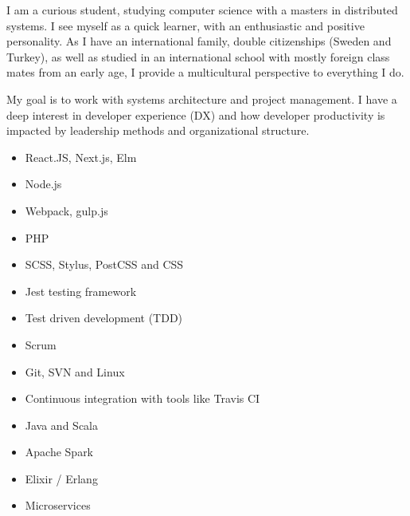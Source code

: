 I am a curious student, studying computer science with a masters in distributed systems. 
I see myself as a quick learner, with an enthusiastic and positive personality. As I have an international family, double citizenships (Sweden and Turkey), as well as studied in an international school with mostly foreign class mates from an early age, I provide a multicultural perspective to everything I do.

My goal is to work with systems architecture and project management. I have a deep interest in developer experience (DX) and how developer productivity is impacted by leadership methods and organizational structure.



\divider




\begin{itemize}
    \item React.JS, Next.js, Elm
    \item Node.js
    \item Webpack, gulp.js
    \item PHP
    \item SCSS, Stylus, PostCSS and CSS
    \item Jest testing framework
\end{itemize}


\divider

\begin{itemize}
    \item Test driven development (TDD)
    \item Scrum
    \item Git, SVN and Linux
    \item Continuous integration with tools like Travis CI
    \item Java and Scala
    \item Apache Spark
    \item Elixir / Erlang
    \item Microservices
\end{itemize}





